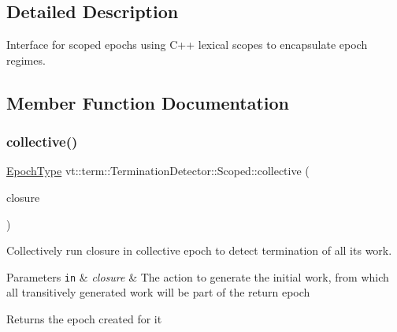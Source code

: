 \subsection{Detailed Description}
Interface for scoped epochs using C++ lexical scopes to encapsulate epoch regimes. 

\subsection{Member Function Documentation}
\mbox{\label{structvt_1_1term_1_1_termination_detector_1_1_scoped_a7debccd958f4257512a8640ab1ffb324}} 
\subsubsection{\texorpdfstring{collective()}{collective()}\hspace{0.1cm}{\footnotesize\ttfamily [1/2]}}
{\footnotesize\ttfamily \hyperlink{namespacevt_a985a5adf291c34a3ca263b3378388236}{Epoch\+Type} vt\+::term\+::\+Termination\+Detector\+::\+Scoped\+::collective (\begin{DoxyParamCaption}\item[{\hyperlink{namespacevt_ae0a5a7b18cc99d7b732cb4d44f46b0f3}{Action\+Type}}]{closure }\end{DoxyParamCaption})\hspace{0.3cm}{\ttfamily [static]}}



Collectively run closure in collective epoch to detect termination of all its work. 


\begin{DoxyParams}[1]{Parameters}
\mbox{\tt in}  & {\em closure} & The action to generate the initial work, from which all transitively generated work will be part of the return epoch\\
\hline
\end{DoxyParams}
\begin{DoxyReturn}{Returns}
the epoch created for it 
\end{DoxyReturn}
\mbox{\label{structvt_1_1term_1_1_termination_detector_1_1_scoped_a199da03a9c1a2fbce14c15484e71bacc}} 
